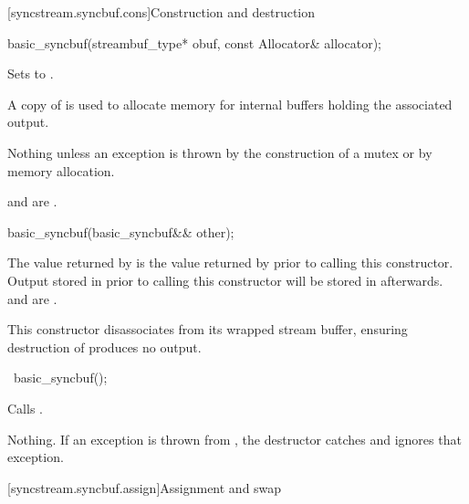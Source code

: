 [syncstream.syncbuf.cons]{Construction and destruction}

%
\begin{itemdecl}
basic_syncbuf(streambuf_type* obuf, const Allocator& allocator);
\end{itemdecl}

\begin{itemdescr}
\pnum
\effects
Sets  to .

\pnum
\remarks
A copy of  is used
to allocate memory for internal buffers
holding the associated output.

\pnum
\throws
Nothing unless an exception is thrown
by the construction of a mutex or
by memory allocation.

\pnum
\ensures
{} and
 are .
\end{itemdescr}

%
\begin{itemdecl}
basic_syncbuf(basic_syncbuf&& other);
\end{itemdecl}

\begin{itemdescr}
\pnum
\ensures
The value returned by 
is the value returned by 
prior to calling this constructor.
Output stored in 
prior to calling this constructor
will be stored in  afterwards.
and
are .

\pnum
\remarks
This constructor disassociates 
from its wrapped stream buffer,
ensuring destruction of  produces no output.
\end{itemdescr}

%
\begin{itemdecl}
~basic_syncbuf();
\end{itemdecl}

\begin{itemdescr}
\pnum
\effects
Calls .

\pnum
\throws
Nothing.
If an exception is thrown from ,
the destructor catches and ignores that exception.
\end{itemdescr}

[syncstream.syncbuf.assign]{Assignment and swap}

